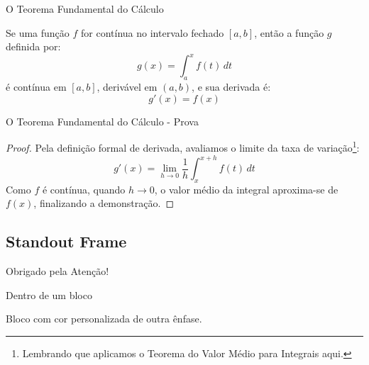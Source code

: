 \documentclass[aspectratio=169]{beamer}
\begin{document}
\begin{frame}{O Teorema Fundamental do Cálculo}
    
    \begin{theorem}[Parte 1]
        Se uma função $f$ for contínua no intervalo fechado $[a, b]$, então a função $g$ definida por:
        $$g(x) = \int_{a}^{x} f(t) \, dt$$
        é contínua em $[a, b]$, derivável em $(a, b)$, e sua derivada é:
        $$g'(x) = f(x)$$
    \end{theorem}

\end{frame}

\begin{frame}{O Teorema Fundamental do Cálculo - Prova}

    \begin{proof}
        Pela definição formal de derivada, avaliamos o limite da taxa de variação\footnote[frame]{Lembrando que aplicamos o Teorema do Valor Médio para Integrais aqui.}:
        $$g'(x) = \lim_{h \to 0} \frac{1}{h} \int_{x}^{x+h} f(t) \, dt$$
        Como $f$ é contínua, quando $h \to 0$, o valor médio da integral aproxima-se de $f(x)$, finalizando a demonstração.
    \end{proof}

\end{frame}

\subsection{Standout Frame}

\begin{frame}[standout]
  Obrigado pela Atenção!
\end{frame}

\begin{frame}[standout]
  \begin{standoutbox}
    Dentro de um bloco
  \end{standoutbox}
\end{frame}

\begin{frame}[standout]
  \begin{standoutbox}[math300]
    Bloco com cor personalizada de outra ênfase.
  \end{standoutbox}
\end{frame}
\end{document}
